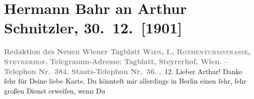 

         
         \newcommand{\erwaehntePersonen}{Personen: Otto Brahm, Ermete Novelli}
         \newcommand{\erwaehnteInstitutionen}{Institutionen: Albert Langen, Lessing-Theater, Neues Wiener Tagblatt}
         \newcommand{\erwaehnteOrte}{Orte: Berlin, Deutsches Theater Berlin, Deutschland, Hamburg, Steyrerhof, Wien}
         \newcommand{\erwaehnteWerke}{Werke: Der Krampus, Der grüne Kakadu. Groteske in einem Akt, Lebendige Stunden. Vier Einakter}
               \section[Hermann Bahr an Arthur Schnitzler, 30. 12. {[}1901{]}]{ Hermann Bahr an Arthur Schnitzler, 30. 12. {[}1901{]}}\nopagebreak{}\rehead{ }\begin{ledgroupsized}[t]{13cm}\normalsize\beginnumbering \toendnotes[C]{\smallbreak\pagebreak[2]} 
\toendnotes[C]{\smallbreak}\pstart
           \noindent{}\centering{}{\pb}\textcolor{gray}{\textbf{Redaktion des Neuen Wiener Tagblatt}}\pend
           \pstart
           \noindent{}\centering{}\textcolor{gray}{\textbf{\textsc{Wien, I., Rothenturmstrasse,
                        Steyrerhof.}}}\pend
           \pstart
           \noindent{}\centering{}\textcolor{gray}{\textbf{Telegramm-Adresse: Tagblatt,
                        Steyrerhof, Wien. – Telephon Nr. 384.
                     Staats-Telephon Nr. 36.}}\pend
           . 12.\pend
           \pstart\center{}Lieber Arthur!\pend\pstart
           Danke ſehr für Deine liebe Karte. Du könnteſt mir allerdings in Berlin einen ſehr, ſehr großen Dienst erweiſen, wenn Du

\end{ledgroupsized}
